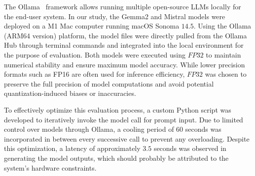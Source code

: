 The Ollama~\cite{13} framework allows running multiple open-source LLMs locally for the end-user system. In our study, the Gemma2 and Mistral models were deployed on a M1 Mac computer running macOS Sonoma $14.5$. 
Using the Ollama (ARM64 version) platform, the model files were directly pulled from the Ollama Hub through terminal commands and integrated into the local environment for the purpose of evaluation. 
Both models were executed using $FP32$ to maintain numerical stability and ensure maximum model accuracy. While lower precision formats such as FP16 are often used for inference efficiency, $FP32$ was chosen to preserve the full precision of model computations and avoid potential quantization-induced biases or inaccuracies. 

To effectively optimize this evaluation process, a custom Python script was developed to iteratively invoke the model call for prompt input. Due to limited control over models through Ollama, a cooling period of $60$ seconds was incorporated in between every successive call to prevent any overloading. 
Despite this optimization, a latency of approximately $3.5$ seconds was observed in generating the model outputs, which should probably be attributed to the system's hardware constraints.